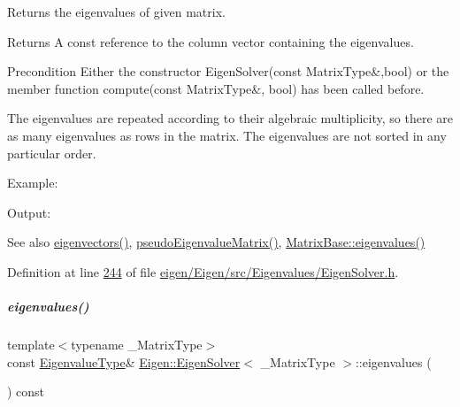 Returns the eigenvalues of given matrix. 

\begin{DoxyReturn}{Returns}
A const reference to the column vector containing the eigenvalues.
\end{DoxyReturn}
\begin{DoxyPrecond}{Precondition}
Either the constructor Eigen\+Solver(const Matrix\+Type\&,bool) or the member function compute(const Matrix\+Type\&, bool) has been called before.
\end{DoxyPrecond}
The eigenvalues are repeated according to their algebraic multiplicity, so there are as many eigenvalues as rows in the matrix. The eigenvalues are not sorted in any particular order.

Example\+: 
\begin{DoxyCodeInclude}
\end{DoxyCodeInclude}
 Output\+: 
\begin{DoxyVerbInclude}
\end{DoxyVerbInclude}


\begin{DoxySeeAlso}{See also}
\hyperlink{group___eigenvalues___module_a66288022802172e3ee059283b26201d7}{eigenvectors()}, \hyperlink{group___eigenvalues___module_a4979eafe0aeef06b19ada7fa5e19db17}{pseudo\+Eigenvalue\+Matrix()}, \hyperlink{group___core___module_a30430fa3d5b4e74d312fd4f502ac984d}{Matrix\+Base\+::eigenvalues()} 
\end{DoxySeeAlso}


Definition at line \hyperlink{eigen_2_eigen_2src_2_eigenvalues_2_eigen_solver_8h_source_l00244}{244} of file \hyperlink{eigen_2_eigen_2src_2_eigenvalues_2_eigen_solver_8h_source}{eigen/\+Eigen/src/\+Eigenvalues/\+Eigen\+Solver.\+h}.

\mbox{\label{group___eigenvalues___module_a114189009e42f5e03372a7a3dfa33b97}} 
\subparagraph{\texorpdfstring{eigenvalues()}{eigenvalues()}\hspace{0.1cm}{\footnotesize\ttfamily [2/2]}}
{\footnotesize\ttfamily template$<$typename \+\_\+\+Matrix\+Type$>$ \\
const \hyperlink{group___eigenvalues___module_adc446bcb60572758fa64515f2825db62}{Eigenvalue\+Type}\& \hyperlink{group___eigenvalues___module_class_eigen_1_1_eigen_solver}{Eigen\+::\+Eigen\+Solver}$<$ \+\_\+\+Matrix\+Type $>$\+::eigenvalues (\begin{DoxyParamCaption}{ }\end{DoxyParamCaption}) const\hspace{0.3cm}{\ttfamily [inline]}}



